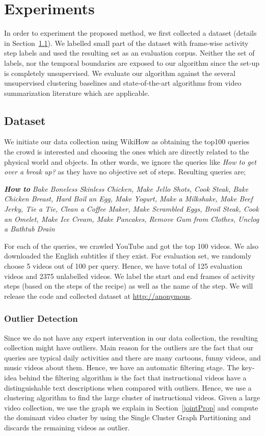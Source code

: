 \section{Experiments}
In order to experiment the proposed method, we first collected a dataset (details in Section~\ref{dataset:sec}). We labelled small part of the dataset with frame-wise activity step labels and used the resulting set as an evaluation corpus. Neither the set of labels, nor the temporal boundaries are exposed to our algorithm since the set-up is completely unsupervised. We evaluate our algorithm against the several unsupervised clustering baselines and state-of-the-art algorithms from video summarization literature which are applicable. 
\subsection{Dataset}
\label{dataset:sec}
We initiate our data collection using WikiHow as obtaining the top100 queries the crowd is interested and choosing the ones which are directly related to the physical world and objects. In other words, we ignore the queries like \emph{How to get over a break up‏?‎} as they have no objective set of steps. Resulting queries are;


\emph{\textbf{How to}}\footnotesize
\emph{Bake Boneless Skinless Chicken, Make Jello Shots, Cook Steak, Bake Chicken Breast, Hard Boil an Egg, Make Yogurt, Make a Milkshake, Make Beef Jerky, Tie a Tie, Clean a Coffee Maker, Make Scrambled Eggs, Broil Steak, Cook an Omelet, Make Ice Cream, Make Pancakes, Remove Gum from Clothes, Unclog a Bathtub Drain}
\normalsize

For each of the queries, we crawled YouTube and got the top 100 videos. We also downloaded the English subtitles if they exist. For evaluation set, we randomly choose 5 videos out of 100 per query. Hence, we have total of 125 evaluation videos and 2375 unlabelled videos. We label the start and end frames of activity steps (\ie based on the steps of the recipe) as well as the name of the step. We will release the code and collected dataset at \url{http://anonymous}.

\subsubsection{Outlier Detection}
\label{filter}
Since we do not have any expert intervention in our data collection, the resulting collection might have outliers. Main reason for the outliers are  the fact that our queries are typical daily activities and there are many cartoons, funny videos, and music videos about them. Hence, we have an automatic filtering stage. The key-idea behind the filtering algorithm is the fact that instructional videos have a distinguishable text descriptions when compared with outliers. Hence, we use a clustering algorithm to find the large cluster of instructional videos. Given a large video collection, we use the graph we explain in Section~\ref{jointProp} and compute the dominant video cluster by using the Single Cluster Graph Partitioning \cite{scgp} and discards the remaining videos as outlier.

